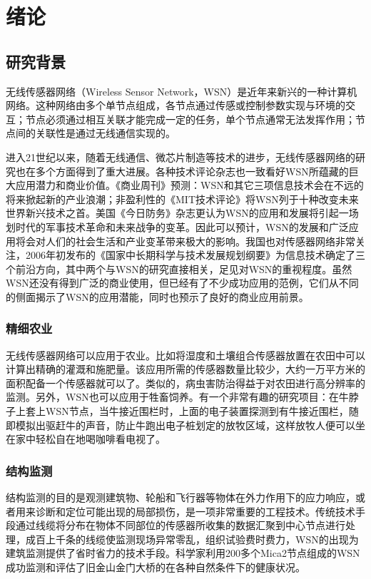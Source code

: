 ﻿\chapter{绪论}\label{preface}

\section{研究背景}
无线传感器网络（Wireless Sensor Network，WSN）是近年来新兴的一种计算机网络。这种网络由多个单节点组成，各节点通过传感或控制参数实现与环境的交互；节点必须通过相互关联才能完成一定的任务，单个节点通常无法发挥作用；节点间的关联性是通过无线通信实现的。

进入21世纪以来，随着无线通信、微芯片制造等技术的进步，无线传感器网络的研究也在多个方面得到了重大进展。各种技术评论杂志也一致看好WSN所蕴藏的巨大应用潜力和商业价值。《商业周刊》预测：WSN和其它三项信息技术会在不远的将来掀起新的产业浪潮；非盈利性的《MIT技术评论》将WSN列于十种改变未来世界新兴技术之首。美国《今日防务》杂志更认为WSN的应用和发展将引起一场划时代的军事技术革命和未来战争的变革。因此可以预计，WSN的发展和广泛应用将会对人们的社会生活和产业变革带来极大的影响。我国也对传感器网络非常关注，2006年初发布的《国家中长期科学与技术发展规划纲要》为信息技术确定了三个前沿方向，其中两个与WSN的研究直接相关，足见对WSN的重视程度。虽然WSN还没有得到广泛的商业使用，但已经有了不少成功应用的范例，它们从不同的侧面揭示了WSN的应用潜能，同时也预示了良好的商业应用前景。

\subsection{精细农业}
无线传感器网络可以应用于农业。比如将湿度和土壤组合传感器放置在农田中可以计算出精确的灌溉和施肥量。该应用所需的传感器数量比较少，大约一万平方米的面积配备一个传感器就可以了。类似的，病虫害防治得益于对农田进行高分辨率的监测。另外，WSN也可以应用于牲畜饲养。有一个非常有趣的研究项目：在牛脖子上套上WSN节点，当牛接近围栏时，上面的电子装置探测到有牛接近围栏，随即模拟出驱赶牛的声音，防止牛跑出电子桩划定的放牧区域，这样放牧人便可以坐在家中轻松自在地喝咖啡看电视了。

\subsection{结构监测}
结构监测的目的是观测建筑物、轮船和飞行器等物体在外力作用下的应力响应，或者用来诊断和定位可能出现的局部损伤，是一项非常重要的工程技术。传统技术手段通过线缆将分布在物体不同部位的传感器所收集的数据汇聚到中心节点进行处理，成百上千条的线缆使监测现场异常零乱，组织试验费时费力，WSN的出现为建筑监测提供了省时省力的技术手段。科学家利用200多个Mica2节点组成的WSN成功监测和评估了旧金山金门大桥的在各种自然条件下的健康状况。

